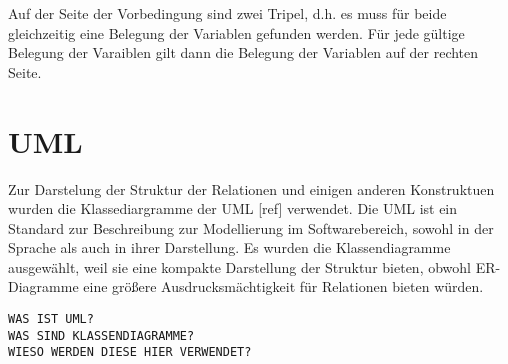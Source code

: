 Auf der Seite der Vorbedingung sind zwei Tripel, d.h. es muss für beide gleichzeitig eine Belegung der Variablen gefunden werden. Für jede gültige Belegung der Varaiblen gilt dann die Belegung der Variablen auf der rechten Seite.

\section{UML}
Zur Darstelung der Struktur der Relationen und einigen anderen Konstruktuen wurden die Klassediargramme der UML [ref] verwendet. Die UML ist ein Standard zur Beschreibung zur Modellierung im Softwarebereich, sowohl in der Sprache als auch in ihrer Darstellung. Es wurden die Klassendiagramme ausgewählt, weil sie eine kompakte Darstellung der Struktur bieten, obwohl ER-Diagramme eine größere Ausdrucksmächtigkeit für Relationen bieten würden.
\begin{verbatim}
WAS IST UML?
WAS SIND KLASSENDIAGRAMME?
WIESO WERDEN DIESE HIER VERWENDET?
\end{verbatim}